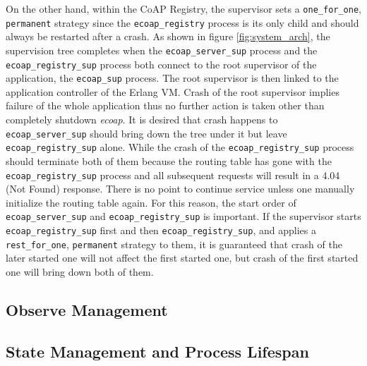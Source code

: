 On the other hand, within the CoAP Registry, the supervisor sets a \verb|one_for_one|, \verb|permanent| strategy since the \verb|ecoap_registry| process is its only child and should always be restarted after a crash. As shown in figure \ref{fig:system_arch}, the supervision tree completes when the \verb|ecoap_server_sup| process and the \verb|ecoap_registry_sup| process both connect to the root supervisor of the application, the \verb|ecoap_sup| process. The root supervisor is then linked to the application controller of the Erlang VM. Crash of the root supervisor implies failure of the whole application thus no further action is taken other than completely shutdown \textit{ecoap}. It is desired that crash happens to \verb|ecoap_server_sup| should bring down the tree under it but leave \verb|ecoap_registry_sup| alone. While the crash of the \verb|ecoap_registry_sup| process should terminate both of them because the routing table has gone with the \verb|ecoap_registry_sup| process and all subsequent requests will result in a 4.04 (Not Found) response. There is no point to continue service unless one manually initialize the routing table again. For this reason, the start order of \verb|ecoap_server_sup| and \verb|ecoap_registry_sup| is important. If the supervisor starts \verb|ecoap_registry_sup| first and then \verb|ecoap_registry_sup|, and applies a \verb|rest_for_one|, \verb|permanent| strategy to them, it is guaranteed that crash of the later started one will not affect the first started one, but crash of the first started one will bring down both of them. 






\subsection{Observe Management}\label{observe_management}

\subsection{State Management and Process Lifespan}\label{state_management}



